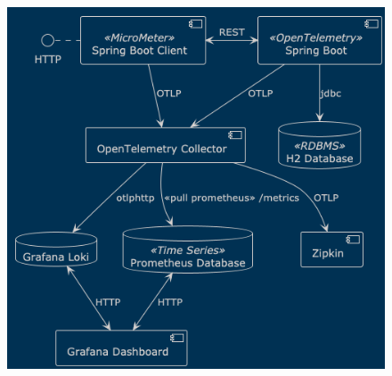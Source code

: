 \documentclass[aspectratio=169]{beamer}
\begin{document}
	\begin{frame}
		\begin{figure}
			\centering
			\includegraphics[width=0.5\linewidth]{Images/otel}
			\label{fig:otel}
		\end{figure}
	\end{frame}
\end{document}
